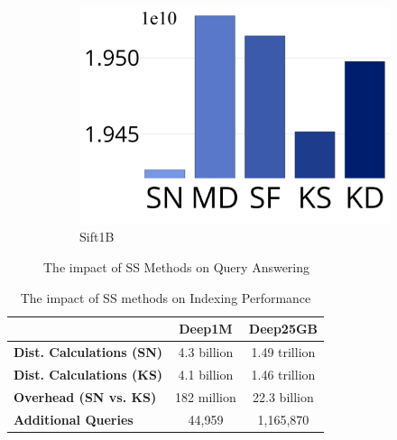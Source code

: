 \begin{figure}[htp]
\begin{subfigure}{\sfig\columnwidth}
			\centering
			\captionsetup{justification=centering}	
			\includegraphics[width=\textwidth]{../img/Experiments/EP/SIFT_1B_100.png}
		\caption{{Sift1B}}
		\label{fig:ss:sift1b}
		\end{subfigure}	
\caption{The impact of SS Methods on Query Answering}
\label{fig:ss:search}
 \end{figure}
 


\begin{table}[h!]
\centering
\begin{tabular}{@{}lcc@{}}
\toprule
& \textbf{Deep1M} & \textbf{Deep25GB} \\ 
\midrule
\textbf{Dist. Calculations (SN)} & 4.3 billion & 1.49 trillion \\
\textbf{Dist. Calculations (KS)} & 4.1 billion & 1.46 trillion \\
\midrule
\textbf{Overhead (SN vs. KS)} & 182 million & 22.3 billion \\
\textbf{Additional Queries} & 44,959 & 1,165,870 \\
\bottomrule
\end{tabular}
\caption{The impact of SS methods on Indexing Performance}
\label{tab:ss:idx}
\end{table}

